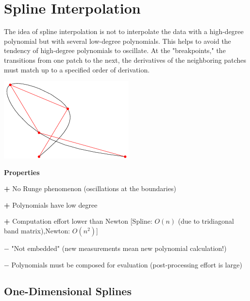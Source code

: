 \section{Spline Interpolation}

\begin{minipage}[c]{14.5cm}
The idea of spline interpolation is not to interpolate the data with a high-degree polynomial but with several low-degree polynomials. This helps to avoid the tendency of high-degree polynomials to oscillate. At the "breakpoints," the transitions from one patch to the next, the derivatives of the neighboring patches must match up to a specified order of derivation.
\end{minipage}
\hfill
\begin{minipage}[c]{4cm}
\includegraphics[width=\textwidth]{bilder/kubikSpline}
\end{minipage}

\textbf{Properties}
\begin{liste}
  \item[\textbf{+}] No Runge phenomenon (oscillations at the boundaries)
  \item[\textbf{+}] Polynomials have low degree
  \item[\textbf{+}] Computation effort lower than Newton [Spline: $O(n)$ (due to tridiagonal band matrix),Newton: $O(n^2)$]
  \item[$\mathbf{-}$] "Not embedded" (new measurements mean new polynomial calculation!)
  \item[$\mathbf{-}$] Polynomials must be composed for evaluation (post-processing effort is large)
\end{liste}


\subsection{One-Dimensional Splines}
